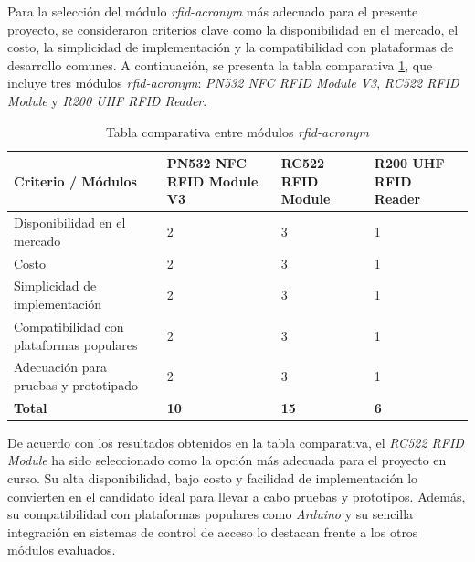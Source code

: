 Para la selección del módulo \textit{\acrshort{rfid-acronym}} más adecuado para el presente proyecto, se consideraron criterios clave como la disponibilidad en el mercado, el costo, la simplicidad de implementación y la compatibilidad con plataformas de desarrollo comunes. A continuación, se presenta la tabla comparativa \ref{fig:tablaRFID}, que incluye tres módulos \textit{\acrshort{rfid-acronym}}: \textit{PN532 NFC RFID Module V3}, \textit{RC522 RFID Module} y \textit{R200 UHF RFID Reader}.

\begin{table}[H]
\centering
\renewcommand{\arraystretch}{1.2} %
\caption{Tabla comparativa entre módulos \textit{\acrshort{rfid-acronym}}}
\label{fig:tablaRFID}
\begin{tabular}{|p{4.5cm}|p{2.5cm}|p{2.5cm}|p{2.5cm}|}
\hline
\textbf{Criterio / Módulos}                 & \textbf{PN532 NFC RFID Module V3} & \textbf{RC522 RFID Module} & \textbf{R200 UHF RFID Reader} \\ \hline
Disponibilidad en el mercado               & 2                                & 3                          & 1                              \\ \hline
Costo                                      & 2                                & 3                          & 1                              \\ \hline
Simplicidad de implementación              & 2                                & 3                          & 1                              \\ \hline
Compatibilidad con plataformas populares   & 2                                & 3                          & 1                              \\ \hline
Adecuación para pruebas y prototipado      & 2                                & 3                          & 1                              \\ \hline
\textbf{Total}                             & \textbf{10}                      & \textbf{15}                & \textbf{6}                     \\ \hline
\end{tabular}
\end{table}


De acuerdo con los resultados obtenidos en la tabla comparativa, el \textit{RC522 RFID Module} ha sido seleccionado como la opción más adecuada para el proyecto en curso. Su alta disponibilidad, bajo costo y facilidad de implementación lo convierten en el candidato ideal para llevar a cabo pruebas y prototipos. Además, su compatibilidad con plataformas populares como \textit{Arduino} y su sencilla integración en sistemas de control de acceso lo destacan frente a los otros módulos evaluados.

